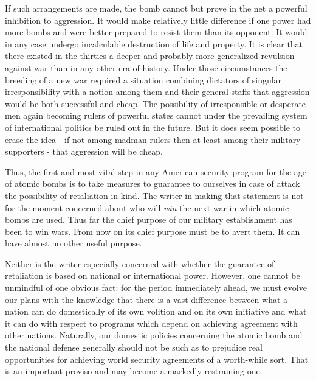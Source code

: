 If such arrangements are made, the bomb cannot but prove in the net a powerful inhibition to aggression. It would make relatively little difference if one power had more bombs and were better prepared to resist them than its opponent. It would in any case undergo incalculable destruction of life and property. It is clear that there existed in the thirties a deeper and probably more generalized revulsion against war than in any other era of history. Under those circumstances the breeding of a new war required a situation combining dictators of singular irresponsibility with a notion among them and their general staffs that aggression would be both successful and cheap. The possibility of irresponsible or desperate men again becoming rulers of powerful states cannot under the prevailing system of international politics be ruled out in the future. But it does seem possible to erase the idea - if not among madman rulers then at least among their military supporters - that aggression will be cheap.

Thus, the first and most vital step in any American security program for the age of atomic bombs is to take measures to guarantee to ourselves in case of attack the possibility of retaliation in kind. The writer in making that statement is not for the moment concerned about who will \emph{win} the next war in which atomic bombs are used. Thus far the chief purpose of our military establishment has been to win wars. From now on its chief purpose must be to avert them. It can have almost no other useful purpose.

Neither is the writer especially concerned with whether the guarantee of retaliation is based on national or international power. However, one cannot be unmindful of one obvious fact: for the period immediately ahead, we must evolve our plans with the knowledge that there is a vast difference between what a nation can do domestically of its own volition and on its own initiative and what it can do with respect to programs which depend on achieving agreement with other nations. Naturally, our domestic policies concerning the atomic bomb and the national defense generally should not be such as to prejudice real opportunities for achieving world security agreements of a worth-while sort. That is an important proviso and may become a markedly restraining one.

